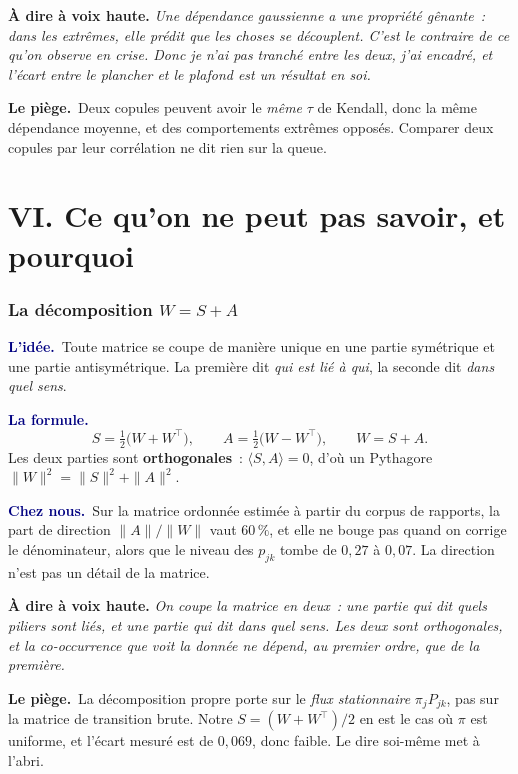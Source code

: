 \documentclass[11pt,a4paper]{article}
\newcommand{\lidee}[1]{\smallskip\noindent\textcolor{navy}{\textbf{L'idée.}}\ #1\par}
\newcommand{\laformule}[1]{\smallskip\noindent\textcolor{navy}{\textbf{La formule.}}\ #1\par}
\newcommand{\cheznous}[1]{\smallskip\noindent\textcolor{navy}{\textbf{Chez nous.}}\ #1\par}
\newcommand{\lepiege}[1]{\smallskip\noindent\textcolor{accent}{\textbf{Le piège.}}\ #1\par}
\newcommand{\laphrase}[1]{\begin{phrasebox}\textbf{À dire à voix haute.} \emph{#1}\end{phrasebox}}
\begin{document}
\laphrase{Une dépendance gaussienne a une propriété gênante~: dans les extrêmes, elle prédit
que les choses se \emph{découplent}. C'est le contraire de ce qu'on observe en crise. Donc
je n'ai pas tranché entre les deux, j'ai encadré, et l'écart entre le plancher et le plafond
est un résultat en soi.}

\lepiege{Deux copules peuvent avoir le \emph{même} $\tau$ de Kendall, donc la même
dépendance \og moyenne\fg{}, et des comportements extrêmes opposés. Comparer deux copules par
leur corrélation ne dit rien sur la queue.}

\part*{VI. Ce qu'on ne peut pas savoir, et pourquoi}

\section{La décomposition $W = S + A$}

\lidee{Toute matrice se coupe de manière unique en une partie symétrique et une partie
antisymétrique. La première dit \emph{qui est lié à qui}, la seconde dit \emph{dans quel
sens}.}

\laformule{
\[
  S=\tfrac12\bigl(W+W^{\top}\bigr), \qquad A=\tfrac12\bigl(W-W^{\top}\bigr),
  \qquad W=S+A .
\]
Les deux parties sont \textbf{orthogonales}~: $\langle S,A\rangle=0$, d'où un Pythagore
$\|W\|^2=\|S\|^2+\|A\|^2$.}

\cheznous{Sur la matrice ordonnée estimée à partir du corpus de rapports, la part de direction
$\|A\|/\|W\|$ vaut $60\,\%$, et elle ne bouge pas quand on corrige le dénominateur, alors que le
niveau des $p_{jk}$ tombe de $0{,}27$ à $0{,}07$. La direction n'est pas un détail de la matrice.}

\laphrase{On coupe la matrice en deux~: une partie qui dit quels piliers sont liés, et une partie
qui dit dans quel sens. Les deux sont orthogonales, et la co-occurrence que voit la donnée ne
dépend, au premier ordre, que de la première.}

\lepiege{La décomposition propre porte sur le \emph{flux stationnaire} $\pi_j P_{jk}$, pas
sur la matrice de transition brute. Notre $S=(W+W^{\top})/2$ en est le cas où $\pi$ est
uniforme, et l'écart mesuré est de $0{,}069$, donc faible. Le dire soi-même met à l'abri.}
\end{document}
